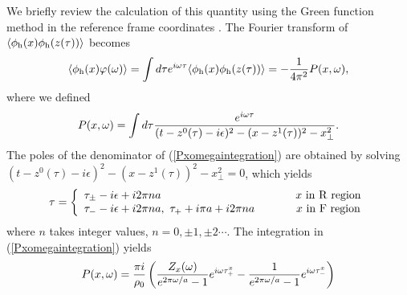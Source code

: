 \documentclass[aps,prd,preprintnumbers,nofootinbib,showpacs,11pt]{revtex4}%
\begin{document}
\begin{widetext}
We briefly review the calculation of this quantity using the Green function 
method in the reference frame coordinates 
 \cite{IYZ,IYZ2013}. 
The Fourier transform of $\langle\phi_{\rm h}(x)\phi_{\rm h}(z(\tau))\rangle$ becomes
\begin{eqnarray}
\langle\phi_{\rm h}(x)\varphi(\omega)\rangle
=\int d\tau e^{i\omega\tau}\langle\phi_{\rm h}(x)\phi_{\rm h}(z(\tau))\rangle =-{1\over4\pi^2} P(x,\omega),
\end{eqnarray}
where we defined 
\begin{eqnarray}
P(x,\omega)=\int d\tau {e^{i\omega\tau}\over (t-z^0(\tau)-i\epsilon)^2-(x-z^1(\tau))^2-x_\perp^2}.
\label{Pxomegaintegration}
\end{eqnarray}
The poles of the denominator of (\ref{Pxomegaintegration}) are obtained by solving
$(t-z^0(\tau)-i\epsilon)^2-(x-z^1(\tau))^2-x_\perp^2=0$, which yields
\begin{eqnarray}
\tau=
\left\{
\begin{array}{lc}
\displaystyle{
\tau_\pm-i\epsilon+i2\pi na}
~~~~&~~~~x{\rm ~in~R~region}
\\
\displaystyle{\tau_--i\epsilon+i2\pi na,~\tau_++i\pi a+i2\pi na}
~~~~&~~~~x{\rm ~in~F~region}
\end{array}
\right.
\end{eqnarray}
where $n$ takes integer values, $n=0,\pm1,\pm2\cdots$. 
The integration in (\ref{Pxomegaintegration}) yields
\begin{eqnarray}
P(x,\omega)=
\displaystyle{{\pi i\over \rho_0}\left({Z_x(\omega)\over e^{2\pi\omega/a}-1}e^{i\omega\tau_+^x}
-{1\over e^{2\pi\omega/a}-1}e^{i\omega\tau_-^x}\right)}

\end{eqnarray}
\end{widetext}
\end{document}
